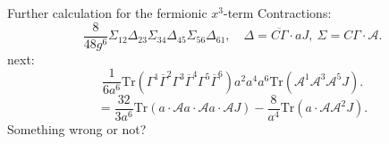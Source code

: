 \begin{correct}
Further calculation for the fermionic $x^3$-term
Contractions:
\[
	\frac{8}{48g^6}\Sigma_{12}\Delta_{23}\Sigma_{34}\Delta_{45}
	\Sigma_{56}\Delta_{61}
	,\quad
	\Delta = \overline{C\Gamma}\cdot a J,~\Sigma = C\Gamma\cdot \mathcal{A}
.\] 
next:
\[
\frac{1}{6 a^6} \mathrm{Tr}(\Gamma^1 \overline{\Gamma}^2 \Gamma^3
\overline{\Gamma}^4 \Gamma^5 \overline{\Gamma}^6)
a^2 a^4 a^6 \mathrm{Tr}(\mathcal{A}^1  \mathcal{A}^3 \mathcal{A}^5 J)
.\] 
\[
= \frac{32}{3a^6}\mathrm{Tr}(a\cdot \mathcal{A} a \cdot \mathcal{A}
a\cdot \mathcal{A} J)
- \frac{8}{ a^4} \mathrm{Tr}(a\cdot \mathcal{A} \mathcal{A}^2 J)
.\] 
Something wrong or not?
\end{correct}

